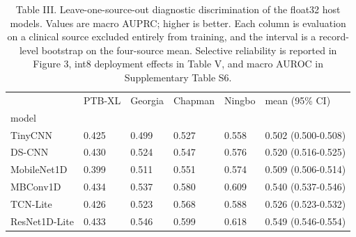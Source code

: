 \begin{table}
\caption{Table III. Leave-one-source-out diagnostic discrimination of the float32 host models. Values are macro AUPRC; higher is better. Each column is evaluation on a clinical source excluded entirely from training, and the interval is a record-level bootstrap on the four-source mean. Selective reliability is reported in Figure 3, int8 deployment effects in Table V, and macro AUROC in Supplementary Table S6.}
\begin{tabular}{llllll}
\toprule
 & PTB-XL & Georgia & Chapman & Ningbo & mean (95\% CI) \\
model &  &  &  &  &  \\
\midrule
TinyCNN & 0.425 & 0.499 & 0.527 & 0.558 & 0.502 (0.500-0.508) \\
DS-CNN & 0.430 & 0.524 & 0.547 & 0.576 & 0.520 (0.516-0.525) \\
MobileNet1D & 0.399 & 0.511 & 0.551 & 0.574 & 0.509 (0.506-0.514) \\
MBConv1D & 0.434 & 0.537 & 0.580 & 0.609 & 0.540 (0.537-0.546) \\
TCN-Lite & 0.426 & 0.523 & 0.568 & 0.588 & 0.526 (0.523-0.532) \\
ResNet1D-Lite & 0.433 & 0.546 & 0.599 & 0.618 & 0.549 (0.546-0.554) \\
\bottomrule
\end{tabular}
\end{table}
